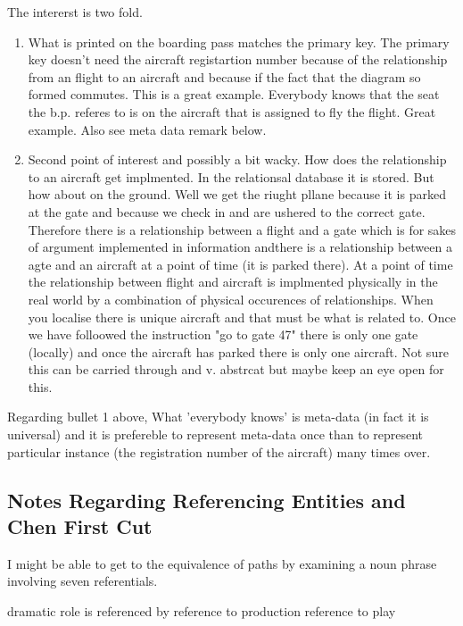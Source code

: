 \begin{noteforfuture}
The intererst is two fold.
\begin{enumerate}
		\item What is printed on the boarding pass matches the primary key.
		The primary key doesn't need the aircraft registartion number because of the relationship from an flight to an aircraft and because if the fact that the diagram so formed commutes. This is a great example. Everybody knows that the seat the b.p. referes to is on the aircraft that is assigned to fly the flight. Great example. Also see meta data remark below.
		\item Second point of interest and possibly a bit wacky.
		How does the relationship to an aircraft get implmented. In the relationsal database it is stored. But how about on the ground. Well we get the riught pllane because it is parked at the gate and because we check in and are ushered to the correct gate. Therefore there is a relationship between a flight and a gate which is for sakes of argument implemented in information andthere is a relationship between a agte and an aircraft at a point of time (it is parked there). At a point of time the relationship between flight and aircraft is implmented physically in the real world by a combination of physical occurences of relationships. When you localise there is unique aircraft and that must be what is related to. Once we have folloowed the instruction "go to gate 47" there is only one gate (locally) and once the aircraft has parked there is only one aircraft. Not sure this can be carried through and v. abstrcat but maybe keep an eye open for this. 
	\end{enumerate}
Regarding bullet 1 above,
	What 'everybody knows' is meta-data (in fact it is universal) and it is prefereble to represent meta-data once than to represent particular instance (the registration number of the aircraft) many times over. 
\end{noteforfuture}

\subsection{Notes Regarding Referencing Entities and Chen First Cut}

\begin{noteforfuture}
I might be able to get to the equivalence of paths by examining
a noun phrase involving seven referentials.

dramatic role is referenced by reference to production reference to play
\end{noteforfuture}


